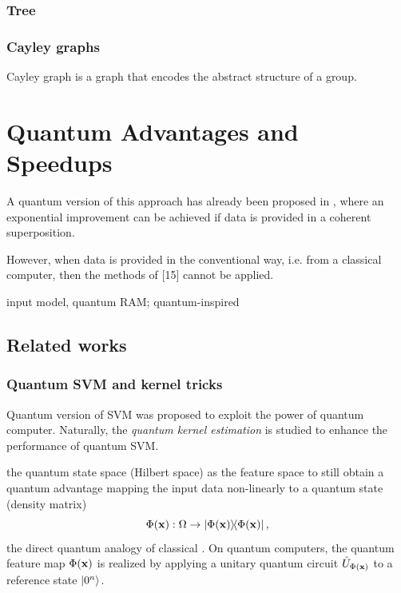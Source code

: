 \subsubsection{Tree}

\subsubsection{Cayley graphs}
\begin{definition}\label{def:cayley_graph}
	Cayley graph is a graph that encodes the abstract structure of a group. 
\end{definition}

\section{Quantum Advantages and Speedups}\label{sec:speedup}
A quantum version of this approach has already been proposed in \cite{rebentrostQuantumSupportVector2014},
where an exponential improvement can be achieved if data is provided in a coherent superposition. 
\begin{remark}
	However, when data is provided in the conventional way, i.e. from a classical computer, then the methods of [15] cannot be applied.
\end{remark}
input model, quantum RAM;
quantum-inspired \cite{tangQuantuminspiredClassicalAlgorithm2019}

\subsection{Related works}\label{sec:qke}

\subsubsection{Quantum SVM and kernel tricks}
Quantum version of SVM was proposed \cite{rebentrostQuantumSupportVector2014} to exploit the power of quantum computer.
Naturally, the \emph{quantum kernel estimation}
\cite{schuldQuantumMachineLearning2019}
\cite{havlicekSupervisedLearningQuantum2019} 
is studied to enhance the performance of quantum SVM.
\begin{definition}\label{def:quantum_feature_map}
	the quantum state space (Hilbert space) as the feature space to still obtain a quantum advantage
	mapping the input data non-linearly to a quantum state (density matrix) 
	\begin{equation}
		\Phi(\vbx): \Omega \to \dyad{\Phi(\vbx)},
		\label{eq:quantum_feature_map}
	\end{equation}
	the direct quantum analogy of classical .
	On quantum computers, the quantum feature map $\Phi(\vb{x})$ is realized by applying a unitary quantum circuit $\hat{U}_{\Phi(\vb{x})}$ to a reference state $\ket{0^n}$.
\end{definition}

